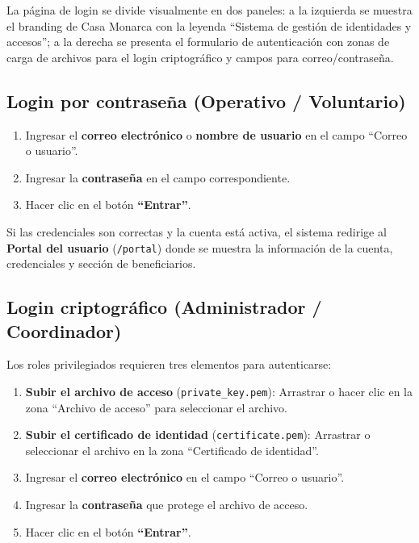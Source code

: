 \documentclass[10pt,letterpaper]{report}
\begin{document}
La página de login se divide visualmente en dos paneles: a la izquierda se muestra el branding de Casa Monarca con la leyenda ``Sistema de gestión de identidades y accesos''; a la derecha se presenta el formulario de autenticación con zonas de carga de archivos para el login criptográfico y campos para correo/contraseña.


\subsection{Login por contraseña (Operativo / Voluntario)}

\begin{enumerate}[leftmargin=2cm]
  \item Ingresar el \textbf{correo electrónico} o \textbf{nombre de usuario} en el campo ``Correo o usuario''.
  \item Ingresar la \textbf{contraseña} en el campo correspondiente.
  \item Hacer clic en el botón \textbf{``Entrar''}.
\end{enumerate}

\begin{successbox}
  Si las credenciales son correctas y la cuenta está activa, el sistema redirige al \textbf{Portal del usuario} (\texttt{/portal}) donde se muestra la información de la cuenta, credenciales y sección de beneficiarios.
\end{successbox}

\subsection{Login criptográfico (Administrador / Coordinador)}

Los roles privilegiados requieren tres elementos para autenticarse:

\begin{enumerate}[leftmargin=2cm]
  \item \textbf{Subir el archivo de acceso} (\texttt{private\_key.pem}): Arrastrar o hacer clic en la zona ``Archivo de acceso'' para seleccionar el archivo.
  \item \textbf{Subir el certificado de identidad} (\texttt{certificate.pem}): Arrastrar o seleccionar el archivo en la zona ``Certificado de identidad''.
  \item Ingresar el \textbf{correo electrónico} en el campo ``Correo o usuario''.
  \item Ingresar la \textbf{contraseña} que protege el archivo de acceso.
  \item Hacer clic en el botón \textbf{``Entrar''}.
\end{enumerate}
\end{document}
